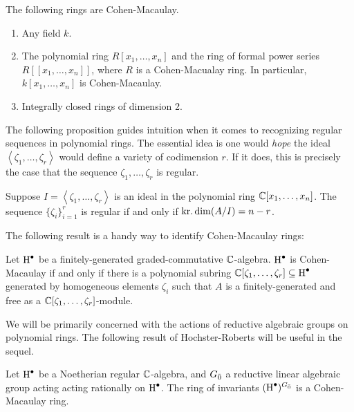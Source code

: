 \begin{example}
  The following rings are Cohen-Macaulay.
  \begin{enumerate}
  \item Any field $k$.
  \item The polynomial ring $R[x_1,\ldots,x_n]$ and the ring of formal power series $R[[x_1,\ldots,x_n]]$, where $R$ is a Cohen-Macualay ring. In particular, $k[x_1,\ldots,x_n]$ is Cohen-Macaulay.
  \item Integrally closed rings of dimension 2.
  \end{enumerate}
\end{example}

The following proposition guides intuition when it comes to recognizing regular sequences in polynomial rings. The essential idea is one would \emph{hope} the ideal $\left<\zeta_1,\ldots,\zeta_r\right>$ would define a variety of codimension $r$. If it does, this is precisely the case that the sequence $\zeta_1,\ldots,\zeta_r$ is regular.

\begin{proposition}[Macaulay]
  Suppose $I = \left<\zeta_1, \ldots , \zeta_r\right>$ is an ideal in the polynomial ring  $\mathbb{C}[x_1,\ldots,x_n]$. The sequence $\{\zeta_i\}_{i=1}^r$ is regular if and only if $\operatorname{kr.dim}(A/I) = n - r$.
\end{proposition}

The following result is a handy way to identify Cohen-Macaulay rings:

\begin{proposition}
  Let $\operatorname{H}^\bullet$ be a finitely-generated graded-commutative $\mathbb{C}$-algebra. $\operatorname{H}^\bullet$ is Cohen-Macaulay if and only if there is a polynomial subring $\mathbb{C}[\zeta_1,\ldots,\zeta_r] \subseteq \operatorname{H}^\bullet$ generated by homogeneous elements $\zeta_i$ such that $A$ is a finitely-generated and free as a $\mathbb{C}[\zeta_1,\ldots,\zeta_r]$-module.
\end{proposition}

We will be primarily concerned with the actions of reductive algebraic groups on polynomial rings. The following result of Hochster-Roberts \cite{MR0347810} will be useful in the sequel.

\begin{theorem}
  Let $\operatorname{H}^\bullet$ be a Noetherian regular $\mathbb{C}$-algebra, and ${G}_{\bar{0}}$ a reductive linear algebraic group acting acting rationally on $\operatorname{H}^\bullet$. The ring of invariants $(\operatorname{H}^\bullet)^{{G}_{\bar{0}}}$ is a Cohen-Macaulay ring.
\end{theorem}

